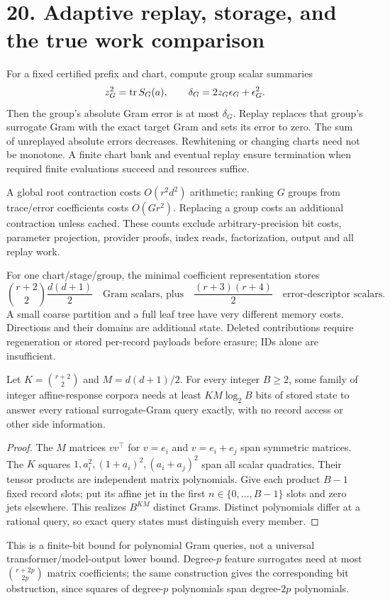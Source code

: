 \newpage
\section*{20. Adaptive replay, storage, and the true work comparison}
For a fixed certified prefix and chart, compute group scalar summaries
\[
 z_G^2=\operatorname{tr} S_G(a),\qquad
 \delta_G=2z_G\epsilon_G+\epsilon_G^2.
\]
Then the group's absolute Gram error is at most $\delta_G$. Replay replaces that group's surrogate Gram with the exact target Gram and sets its error to zero. The sum of unreplayed absolute errors decreases. Rewhitening or changing charts need not be monotone. A finite chart bank and eventual replay ensure termination when required finite evaluations succeed and resources suffice.

A global root contraction costs $O(r^2d^2)$ arithmetic; ranking $G$ groups from trace/error coefficients costs $O(Gr^2)$. Replacing a group costs an additional contraction unless cached. These counts exclude arbitrary-precision bit costs, parameter projection, provider proofs, index reads, factorization, output and all replay work.

For one chart/stage/group, the minimal coefficient representation stores
\[
 \binom{r+2}{2}\frac{d(d+1)}2
 \quad\text{Gram scalars, plus}\quad \frac{(r+3)(r+4)}2
 \quad\text{error-descriptor scalars}.
\]
A small coarse partition and a full leaf tree have very different memory costs. Directions and their domains are additional state. Deleted contributions require regeneration or stored per-record payloads before erasure; IDs alone are insufficient.

\begin{theorem}
Let $K=\binom{r+2}{2}$ and $M=d(d+1)/2$. For every integer $B\geq2$, some family of integer affine-response corpora needs at least $KM\log_2B$ bits of stored state to answer every rational surrogate-Gram query exactly, with no record access or other side information.
\end{theorem}
\begin{proof}
The $M$ matrices $vv^\top$ for $v=e_i$ and $v=e_i+e_j$ span symmetric matrices. The $K$ squares $1,a_i^2,(1+a_i)^2,(a_i+a_j)^2$ span all scalar quadratics. Their tensor products are independent matrix polynomials. Give each product $B-1$ fixed record slots; put its affine jet in the first $n\in\{0,\ldots,B-1\}$ slots and zero jets elsewhere. This realizes $B^{KM}$ distinct Grams. Distinct polynomials differ at a rational query, so exact query states must distinguish every member.
\end{proof}
This is a finite-bit bound for polynomial Gram queries, not a universal transformer/model-output lower bound. Degree-$p$ feature surrogates need at most $\binom{r+2p}{2p}$ matrix coefficients; the same construction gives the corresponding bit obstruction, since squares of degree-$p$ polynomials span degree-$2p$ polynomials.

